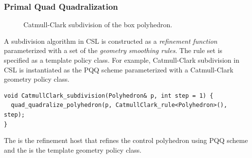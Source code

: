 

\subsubsection{Primal Quad Quadralization}

\begin{figure}[htb]
    \caption{Catmull-Clark subdivision of the box polyhedron.}
    \label{fig:cc}
\end{figure}

A subdivision algorithm in CSL is constructed as a
\emph{refinement function} parameterized with a set of the  
\emph{geometry smoothing rules}. The rule set is specified as
a template policy class. For example, Catmull-Clark
subdivision in CSL is instantiated as the PQQ scheme 
parameterized with a Catmull-Clark geometry policy class.
\begin{lstlisting}
void CatmullClark_subdivision(Polyhedron& p, int step = 1) {
  quad_quadralize_polyhedron(p, CatmullClark_rule<Polyhedron>(), step);
}
\end{lstlisting}
The  is the refinement host
that refines the control polyhedron using PQQ scheme and the  
 is the template geometry policy class.
\\

